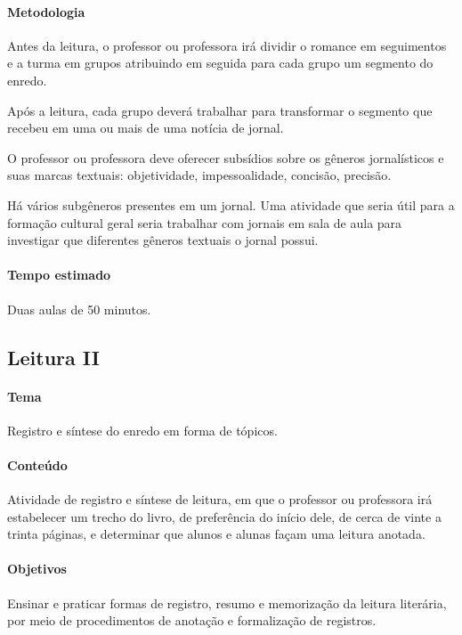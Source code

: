 \documentclass[12pt]{extarticle}
\begin{document}

\paragraph{Metodologia}
Antes da leitura, o professor ou professora irá dividir o romance em
seguimentos e a turma em grupos atribuindo em seguida para cada grupo um
segmento do enredo.

Após a leitura, cada grupo deverá trabalhar para transformar o segmento
que recebeu em uma ou mais de uma notícia de jornal.

O professor ou professora deve oferecer subsídios sobre os gêneros
jornalísticos e suas marcas textuais: objetividade, impessoalidade,
concisão, precisão.

Há vários subgêneros presentes em um jornal. Uma atividade que seria
útil para a formação cultural geral seria trabalhar com jornais em sala
de aula para investigar que diferentes gêneros textuais o jornal possui.

\paragraph{Tempo estimado} Duas aulas de 50 minutos.

\subsection{Leitura II}


\paragraph{Tema} Registro e síntese do enredo em forma de tópicos.

\paragraph{Conteúdo} Atividade de registro e síntese de leitura, em que
o professor ou professora irá estabelecer um trecho do
livro, de preferência do início dele, de cerca de vinte a trinta
páginas, e determinar que alunos e alunas façam uma leitura anotada.

\paragraph{Objetivos}
Ensinar e praticar formas de registro, resumo e memorização da leitura
literária, por meio de procedimentos de anotação e formalização de
registros.
\end{document}
